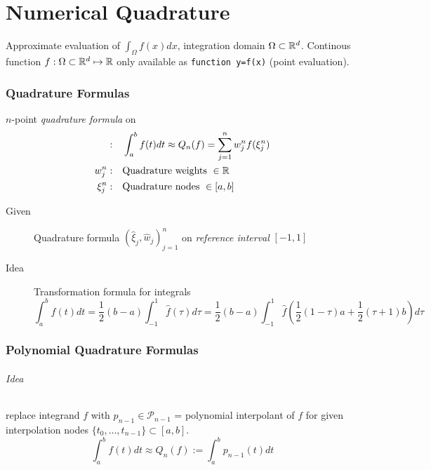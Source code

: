 \part{Numerical Quadrature}

Approximate evaluation of $\int_\Omega f(x) dx$, integration domain $\Omega \subset \mathbb{R}^d$. Continous function $f:\Omega \subset \mathbb{R}^d \mapsto \mathbb{R}$ only available as \verb|function y=f(x)| (point evaluation).
\section{Quadrature Formulas}
	$n$-point \emph{quadrature formula} on 
	\begin{align*}
		[a,b]: \quad &\int_a^b f(t) dt \approx Q_n(f) = \sum_{j=1}^n w_j^n f(\xi_j^n)\\
		w_j^n:\quad &\text{Quadrature weights }\in \R \\
		\xi_j^n:\quad&\text{Quadrature nodes } \in [a,b]
	\end{align*}
	\begin{description}
	 \item[Given] Quadrature formula $(\hat \xi_j,\hat w_j)_{j=1}^n$ on \emph{reference interval} $[-1,1]$
	 \item[Idea] Transformation formula for integrals
		\[
		 \int_a^b f(t) dt = \frac{1}{2}(b-a)\int_{-1}^1\hat f(\tau) d \tau = \frac{1}{2}(b-a)\int_{-1}^1\hat f\left(\frac{1}{2}(1-\tau)a+\frac{1}{2}(\tau+1)b\right) d\tau
		\]

	\end{description}

\section{Polynomial Quadrature Formulas}
	\paragraph{Idea} replace integrand $f$  with $p_{n-1} \in \mathcal P_{n-1}$ = polynomial interpolant of $f$ for given interpolation nodes $\{t_0,\ldots,t_{n-1}\} \subset [a,b]$.
	 \[
	  \int_a^b f(t) dt \approx Q_n(f) := \int_a^b p_{n-1}(t) dt
	 \]

